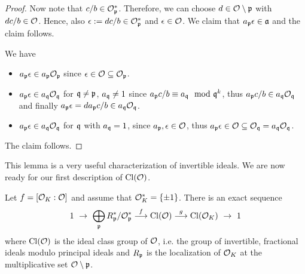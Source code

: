 \begin{proof}
    Now note that $c/b \in \O_\p^*$.
    Therefore, we can choose $d \in \O \setminus \p$ with $dc/b \in \O$.
    Hence, also $\epsilon := dc/b \in \O_\p^*$ and $\epsilon \in \O$.
    We claim that $a_\p \epsilon \in \a$ and the claim follows.

    We have
    \begin{itemize}
        \item $a_\p \epsilon \in a_\p\O_\p$ since $\epsilon \in \O \subseteq \O_\p$.
        \item $a_\p \epsilon \in a_\q\O_\q$ for $\q \neq \p$, $a_\q \neq 1$ since $a_\p c/b \equiv a_\q \mod \q^k$, thus $a_\p c/b \in a_\q\O_\q$ and finally $a_\p \epsilon = d a_\p c/b \in a_\q\O_\q$.
        \item $a_\p \epsilon \in a_\q\O_\q$ for $\q$ with $a_\q = 1$, since $a_\p, \epsilon \in \O$, thus $a_\p \epsilon \in \O \subseteq \O_\q = a_\q\O_\q$.
    \end{itemize}
    The claim follows.
\end{proof}
This lemma is a very useful characterization of invertible ideals.
We are now ready for our first description of $\Cl(\O)$.
\begin{lemma}
    Let $f = [\O_K : \O]$ and assume that $\O_K^* = \{ \pm 1 \}$.
    There is an exact sequence
    \begin{equation*}
        1 \ \to \ \bigoplus_\p R_\p^*/\O_\p^* \overset{f}{\longrightarrow} \Cl(\O) \overset{g}{\longrightarrow} \Cl(\O_K) \ \to \ 1
    \end{equation*}
    where $\Cl(\O)$ is the ideal class group of $\O$, i.e. the group of invertible, fractional ideals modulo principal ideals and $R_\p$ is the localization of $\O_K$ at the multiplicative set $\O \setminus \p$.
\end{lemma}
